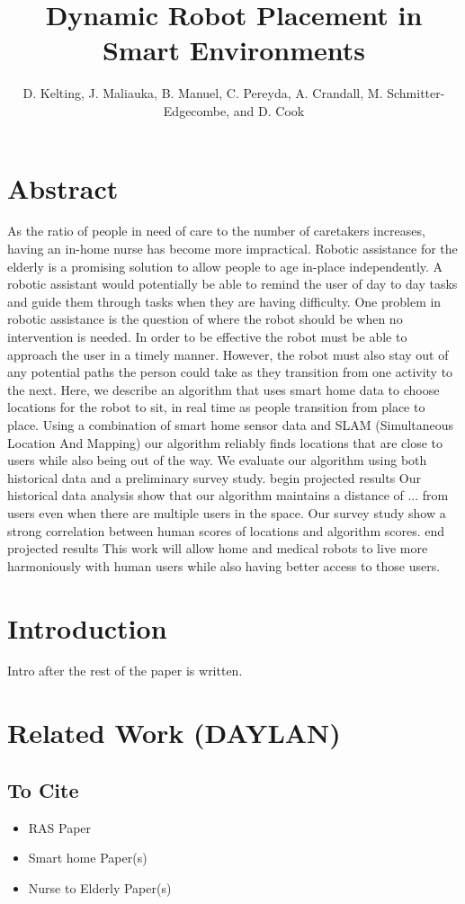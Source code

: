 \documentclass[11pt, draft, a4paper]{IEEEtran}
\author{D. Kelting, J. Maliauka, B. Manuel, C. Pereyda, A. Crandall, M. Schmitter-Edgecombe, and D. Cook}
\title{Dynamic Robot Placement in Smart Environments}
\begin{document}
\maketitle


\section{Abstract}
As the ratio of people in need of care to the number of caretakers increases, having an in-home nurse has become more impractical. Robotic assistance for the elderly is a promising solution to allow people to age in-place independently. A robotic assistant would potentially be able to remind the user of day to day tasks and guide them through tasks when they are having difficulty. One problem in robotic assistance is the question of where the robot should be when no intervention is needed. In order to be effective the robot must be able to approach the user in a timely manner. However, the robot must also stay out of any potential paths the person could take as they transition from one activity to the next. Here, we describe an algorithm that uses smart home data to choose locations for the robot to sit, in real time as people transition from place to place. Using a combination of smart home sensor data and SLAM (Simultaneous Location And Mapping) our algorithm reliably finds locations that are close to users while also being out of the way. We evaluate our algorithm using both historical data and a preliminary survey study. \textlangle{}begin projected results\textrangle{} Our historical data analysis show that our algorithm maintains a distance of \textlangle{}...\textrangle{} from users even when there are multiple users in the space. Our survey study show a strong correlation between human scores of locations and algorithm scores. \textlangle{}end projected results\textrangle{} This work will allow home and medical robots to live more harmoniously with human users while also having better access to those users.


\section{Introduction}
Intro after the rest of the paper is written. 

\section{Related Work (DAYLAN)}
\subsection{To Cite}
\begin{itemize}
    \item RAS Paper
    \item Smart home Paper(s)
    \item Nurse to Elderly Paper(s)
\end{itemize}
\end{document}
